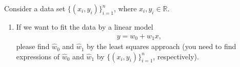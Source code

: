 \newcommand{\school}{\text{University of Science and Technology of China}}
\newcommand{\course}{\text{Introduction to Machine Learning}}
\newcommand{\semester}{\text{Fall 2022}}
\newcommand{\lecturer}{\text{Jie Wang}}
\newcommand{\posted}{\text{Oct. 11, 2022}}
\newcommand{\due}{\text{Oct. 25, 2022}}
\newcommand{\hwno}{\text{2}}
\newcommand{\name}{\text{Yunqin Zhu}}
\newcommand{\id}{\text{PB20061372}}


\maketitle


\begin{exercise}
    Consider a data set $\{ (x_i ,y_i) \}_{i=1}^{n}$, where $x_i,y_i\in \mathbb{R}$.
    \begin{enumerate}
        \item If we want to fit the data by a linear model
            \begin{align}\label{eqn:linear}
                y =  w_0 + w_1 x,
            \end{align}
            please find $\hat{w}_0$ and $\hat{w}_1$ by the least squares approach (you need to find expressions of $\hat{w}_0$ and $\hat{w}_1$ by $\{ (x_i ,y_i) \}_{i=1}^{n}$, respectively).
            

\end{enumerate}
\end{exercise}
